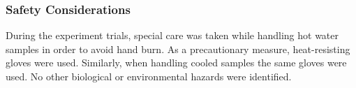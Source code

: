 \documentclass[../main.tex]{subfiles}
\begin{document}




\subsubsection{Safety Considerations}

During the experiment trials, special care was taken while handling hot water samples in order to avoid hand burn. As a precautionary measure, heat-resisting gloves were used. Similarly, when handling cooled samples the same gloves were used. No other biological or environmental hazards were identified.
\end{document}
